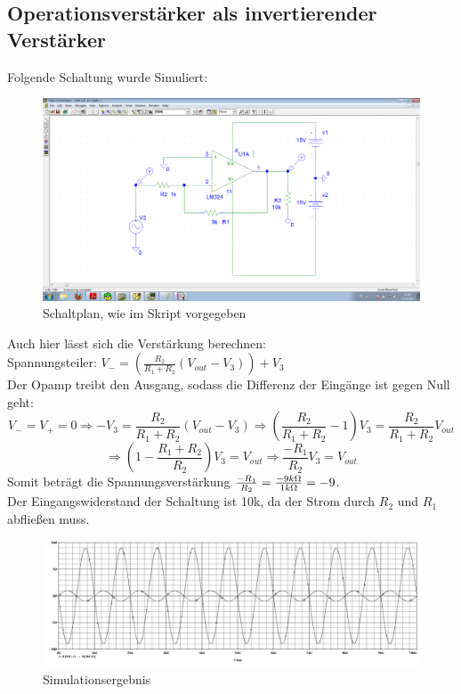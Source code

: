 \subsection{Operationsverstärker als invertierender Verstärker}
Folgende Schaltung wurde Simuliert:
\begin{figure}[H]
	\centering
	\includegraphics[width=\linewidth]{versuch6/spice/schem631.png}
	\caption{Schaltplan, wie im Skript vorgegeben}
\end{figure}
Auch hier lässt sich die Verstärkung berechnen:\\
Spannungsteiler: $ V_-=\left( \frac{R_2}{R_1+R_2} \left(V_{out}-V_3\right) \right) +V_3 $\\
Der Opamp treibt den Ausgang, sodass die Differenz der Eingänge ist gegen Null geht: \[ V_-=V_+=0 \Rightarrow -V_3 = \frac{R_2}{R_1+R_2} \left(V_{out}-V_3\right) \Rightarrow \left( \frac{R_2}{R_1+R_2} -1 \right) V_3 = \frac{R_2}{R_1+R_2} V_{out}\]
\[\Rightarrow \left(1-\frac{R_1+R_2}{R_2}\right)V_3=V_{out} \Rightarrow \frac{-R_1}{R_2}V_3 = V_{out} \]
Somit beträgt die Spannungsverstärkung $ \frac{-R_1}{R_2} = \frac{-9k\Omega}{1k\Omega} = -9 $.\\
Der Eingangswiderstand der Schaltung ist 10k\Ohm, da der Strom durch $ R_2 $ und $ R_1 $ abfließen muss.
\begin{figure}[H]
	\centering
	\includegraphics[width=\linewidth]{versuch6/spice/631.png}
	\caption{Simulationsergebnis}
\end{figure}
